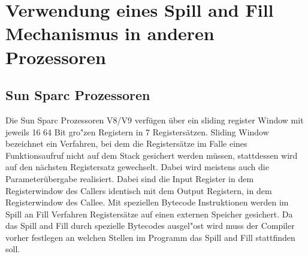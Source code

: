 \begin{minipage}{\linewidth}
\section{Verwendung eines Spill and Fill Mechanismus in anderen Prozessoren}
\subsection{Sun Sparc Prozessoren}
Die Sun Sparc Prozessoren V8/V9 verf\"ugen \"uber ein sliding register Window mit jeweils 16 64 Bit gro"zen Registern in 7 Registers\"atzen. Sliding Window bezeichnet ein Verfahren, bei dem die Registers\"atze im Falle eines Funktionsaufruf nicht auf dem Stack gesichert werden m\"ussen, stattdessen wird auf den n\"achsten Registersatz gewechselt. Dabei wird meistens auch die Parameter\"ubergabe realisiert. Dabei sind die Input Register in dem Registerwindow des Callers identisch mit dem Output Registern, in dem Registerwindow des Callee.   
Mit speziellen Bytecode Instruktionen werden im Spill an Fill Verfahren Registers\"atze auf einen externen Speicher gesichert. Da das Spill and Fill durch spezielle Bytecodes ausgel"ost wird muss der Compiler vorher festlegen an welchen Stellen im Programm das Spill and Fill stattfinden soll. \cite{Gove}
\end{minipage}